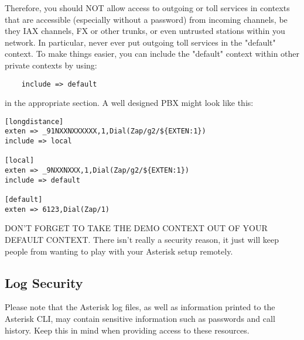 Therefore, you should NOT allow access to outgoing or toll services in
contexts that are accessible (especially without a password) from incoming
channels, be they IAX channels, FX or other trunks, or even untrusted
stations within you network.  In particular, never ever put outgoing toll
services in the "default" context.  To make things easier, you can include
the "default" context within other private contexts by using:

\begin{verbatim}
	include => default
\end{verbatim}

in the appropriate section.  A well designed PBX might look like this:

\begin{verbatim}
[longdistance]
exten => _91NXXNXXXXXX,1,Dial(Zap/g2/${EXTEN:1})
include => local

[local]
exten => _9NXXNXXX,1,Dial(Zap/g2/${EXTEN:1})
include => default

[default]
exten => 6123,Dial(Zap/1)
\end{verbatim}

DON'T FORGET TO TAKE THE DEMO CONTEXT OUT OF YOUR DEFAULT CONTEXT.  There
isn't really a security reason, it just will keep people from wanting to 
play with your Asterisk setup remotely.

\subsection{Log Security}

Please note that the Asterisk log files, as well as information printed to the
Asterisk CLI, may contain sensitive information such as passwords and call 
history.  Keep this in mind when providing access to these resources.
